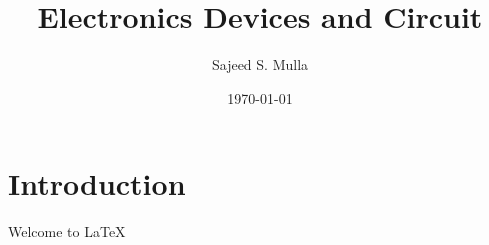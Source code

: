 \documentclass[12pt,a4paper,twoside]{report}
\title{Electronics Devices and Circuit}
\author{Sajeed S. Mulla}
\date{\today}
\begin{document}
\maketitle
\tableofcontents
\pagestyle{fancy}
\fancyhf{}
\fancyfoot[RO, LE]{\thepage}
\chapter{Introduction}
Welcome to \LaTeX
\lipsum
\lipsum[2]
\end{document}
